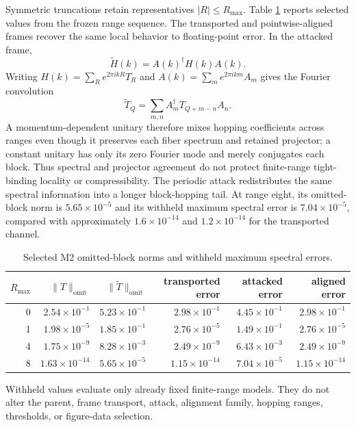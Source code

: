 Symmetric truncations retain representatives $|R|\leq R_{\max}$. Table
\ref{tab:supp-m2-ranges} reports selected values from the frozen range
sequence. The transported and pointwise-aligned frames recover the same local
behavior to floating-point error. In the attacked frame,
\[
 \widetilde H(k)=A(k)^\dagger H(k)A(k).
\]
Writing $H(k)=\sum_R e^{2\pi i kR}T_R$ and
$A(k)=\sum_m e^{2\pi i km}A_m$ gives the Fourier convolution
\[
 \widetilde T_Q=\sum_{m,n}A_m^\dagger T_{Q+m-n}A_n.
\]
A momentum-dependent unitary therefore mixes hopping coefficients across
ranges even though it preserves each fiber spectrum and retained projector; a
constant unitary has only its zero Fourier mode and merely conjugates each
block. Thus spectral and projector agreement do not protect finite-range
tight-binding locality or compressibility. The periodic attack redistributes
the same spectral information into a longer block-hopping tail. At range eight,
its omitted-block norm is $5.65\times10^{-5}$ and its withheld maximum spectral
error is $7.04\times10^{-5}$, compared with approximately
$1.6\times10^{-14}$ and $1.2\times10^{-14}$ for the transported channel.

\begin{table}[t]
\centering
\scriptsize
\caption{Selected M2 omitted-block norms and withheld maximum spectral errors.}
\label{tab:supp-m2-ranges}
\begin{tabular}{@{}rrrrrr@{}}
\toprule
$R_{\max}$ & $\|T\|_{\mathrm{omit}}$ & $\|\widetilde T\|_{\mathrm{omit}}$
& transported error & attacked error & aligned error\\
\midrule
0 & $2.54\!\times\!10^{-1}$ & $5.23\!\times\!10^{-1}$
  & $2.98\!\times\!10^{-1}$ & $4.45\!\times\!10^{-1}$ & $2.98\!\times\!10^{-1}$\\
1 & $1.98\!\times\!10^{-5}$ & $1.85\!\times\!10^{-1}$
  & $2.76\!\times\!10^{-5}$ & $1.49\!\times\!10^{-1}$ & $2.76\!\times\!10^{-5}$\\
4 & $1.75\!\times\!10^{-9}$ & $8.28\!\times\!10^{-3}$
  & $2.49\!\times\!10^{-9}$ & $6.43\!\times\!10^{-3}$ & $2.49\!\times\!10^{-9}$\\
8 & $1.63\!\times\!10^{-14}$ & $5.65\!\times\!10^{-5}$
  & $1.15\!\times\!10^{-14}$ & $7.04\!\times\!10^{-5}$ & $1.15\!\times\!10^{-14}$\\
\bottomrule
\end{tabular}
\end{table}

Withheld values evaluate only already fixed finite-range models. They do not
alter the parent, frame transport, attack, alignment family, hopping ranges,
thresholds, or figure-data selection.


